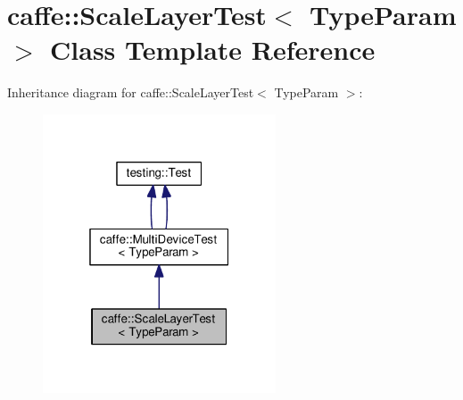 \hypertarget{classcaffe_1_1_scale_layer_test}{}\section{caffe\+:\+:Scale\+Layer\+Test$<$ Type\+Param $>$ Class Template Reference}
\label{classcaffe_1_1_scale_layer_test}


Inheritance diagram for caffe\+:\+:Scale\+Layer\+Test$<$ Type\+Param $>$\+:
\nopagebreak
\begin{figure}[H]
\begin{center}
\leavevmode
\includegraphics[width=196pt]{classcaffe_1_1_scale_layer_test__inherit__graph}
\end{center}
\end{figure}
